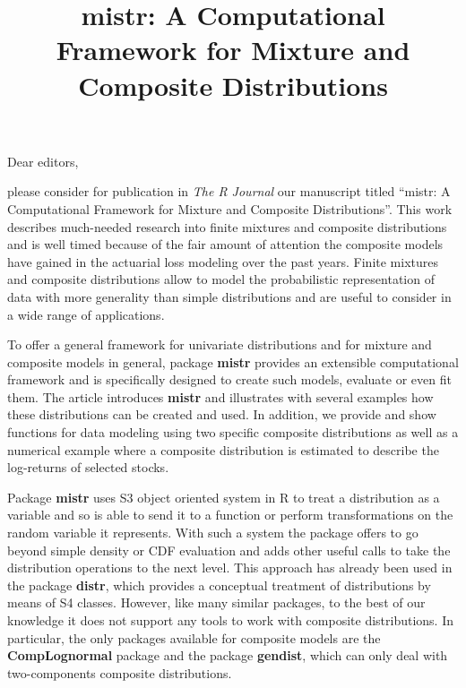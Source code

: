 \documentclass{article}
\title{\textbf{mistr: A Computational Framework for Mixture and Composite Distributions } \\ }
\date{}
\newcommand{\pkg}[1]{\textbf{\textsf{#1}}}
\begin{document}
\maketitle
{}

\noindent Dear editors,

\vspace{0.25cm}
\noindent  please consider for publication in {\it The R Journal} our manuscript titled ``mistr: A Computational Framework for Mixture and Composite Distributions''. This work describes much-needed research into finite mixtures and composite distributions and is well timed because of the fair amount of attention the composite models have gained in the actuarial loss modeling over the past years. Finite mixtures and composite distributions allow to model the probabilistic representation of data with more generality than simple distributions and are useful to consider in a wide range of applications.

\vspace{0.25cm}
\noindent  To offer a general framework for univariate distributions and for mixture and composite models in general, package \pkg{mistr} provides an extensible computational framework and is specifically designed to create such models, evaluate or even fit them. The article introduces \pkg{mistr} and illustrates with several examples how these distributions can be created and used. In addition, we provide and show functions for data modeling using two specific composite distributions as well as a numerical example where a composite distribution is estimated to describe the log-returns of selected stocks.

\vspace{0.25cm}
\noindent  Package \pkg{mistr} uses S3 object oriented system in R to treat a distribution as a variable and so is able to send it to a function or perform transformations on the random variable it represents. With such a system the package offers to go beyond simple density or CDF evaluation and adds other useful calls to take the distribution operations to the next level. This approach has already been used in the package \pkg{distr}, which provides a conceptual treatment of distributions by means of S4 classes. However, like many similar packages, to the best of our knowledge it does not support any tools to work with composite distributions. In particular, the only packages available for composite models are the \pkg{CompLognormal} package and the package \pkg{gendist}, which can only deal with two-components composite distributions.
\end{document}

